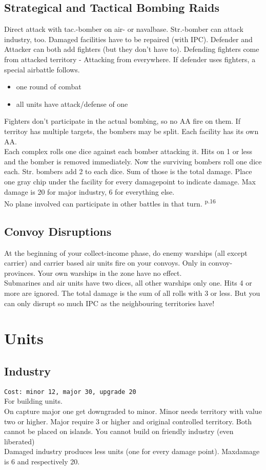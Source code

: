 \documentclass[10pt,twoside]{article}
\begin{document}
\begin{multicols*}{3}
\subsection*{Strategical and Tactical Bombing Raids}
Direct attack with tac.-bomber on air- or navalbase. Str.-bomber can attack industry, too.
Damaged facilities have to be repaired (with IPC). Defender and Attacker can both add fighters (but they don't have to). Defending fighters come from attacked territory - Attacking from everywhere. If defender uses fighters, a special airbattle follows. 
\begin{itemize}
\item one round of combat
\item all units have attack/defense of one
\end{itemize}
Fighters don't participate in the actual bombing, so no AA fire on them. If territoy has multiple targets, the bombers may be split. Each facility has its own AA.\\
Each complex rolls one dice against each bomber attacking it. Hits on 1 or less and the bomber is removed immediately. Now the surviving bombers roll one dice each. Str. bombers add 2 to each dice. Sum of those is the total damage. Place one gray chip under the facility for every damagepoint to indicate damage. Max damage is 20 for major industry, 6 for everything else.\\
No plane involved can participate in other battles in that turn. \textsuperscript{p.16}

\subsection*{Convoy Disruptions}
At the beginning of your collect-income phase, do enemy warships (all except carrier) and carrier based air units fire on your convoys. Only in convoy-provinces. Your own warships in the zone have no effect.\\
Submarines and air units have two dices, all other warships only one. Hits 4 or more are ignored. The total damage is the sum of all rolls with 3 or less. But you can only disrupt so much IPC as the neighbouring territories have!

\pagebreak

\section*{Units}
\subsection*{Industry}
\texttt{Cost: minor 12, major 30, upgrade 20}\\
For building units.\\
On capture major one get downgraded to minor.
Minor needs territory with value two or higher. Major require 3 or higher and original controlled territory. Both cannot be placed on islands. You cannot build on friendly industry (even liberated)\\
Damaged industry produces less units (one for every damage point). Maxdamage is 6 and respectively 20.


\end{multicols*}
\end{document}
